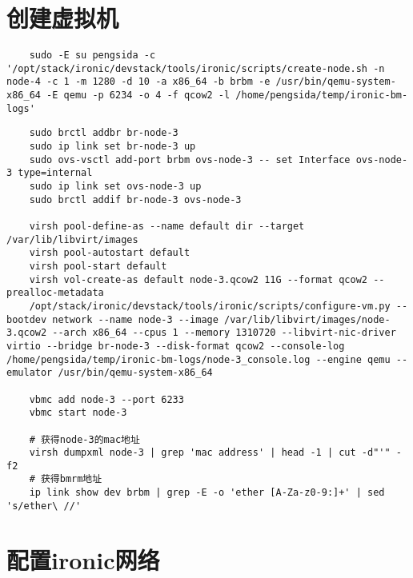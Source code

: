 \documentclass[a4paper,left=1.5cm,right=1.5cm,11pt]{article}
\begin{document}
\section{创建虚拟机}

	\begin{lstlisting}
	sudo -E su pengsida -c '/opt/stack/ironic/devstack/tools/ironic/scripts/create-node.sh -n node-4 -c 1 -m 1280 -d 10 -a x86_64 -b brbm -e /usr/bin/qemu-system-x86_64 -E qemu -p 6234 -o 4 -f qcow2 -l /home/pengsida/temp/ironic-bm-logs'
	\end{lstlisting}

	\begin{lstlisting}
	sudo brctl addbr br-node-3
	sudo ip link set br-node-3 up
	sudo ovs-vsctl add-port brbm ovs-node-3 -- set Interface ovs-node-3 type=internal
	sudo ip link set ovs-node-3 up
	sudo brctl addif br-node-3 ovs-node-3

	virsh pool-define-as --name default dir --target /var/lib/libvirt/images
	virsh pool-autostart default
	virsh pool-start default
	virsh vol-create-as default node-3.qcow2 11G --format qcow2 --prealloc-metadata
	/opt/stack/ironic/devstack/tools/ironic/scripts/configure-vm.py --bootdev network --name node-3 --image /var/lib/libvirt/images/node-3.qcow2 --arch x86_64 --cpus 1 --memory 1310720 --libvirt-nic-driver virtio --bridge br-node-3 --disk-format qcow2 --console-log /home/pengsida/temp/ironic-bm-logs/node-3_console.log --engine qemu --emulator /usr/bin/qemu-system-x86_64
	
	vbmc add node-3 --port 6233
	vbmc start node-3

	# 获得node-3的mac地址
	virsh dumpxml node-3 | grep 'mac address' | head -1 | cut -d"'" -f2
	# 获得bmrm地址
	ip link show dev brbm | grep -E -o 'ether [A-Za-z0-9:]+' | sed 's/ether\ //'
	\end{lstlisting}


\section{配置ironic网络}
\end{document}
